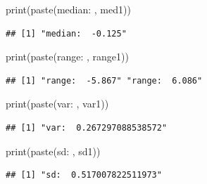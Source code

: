\documentclass[
]{article}
\newenvironment{Shaded}{\begin{snugshade}}{\end{snugshade}}
\newcommand{\FunctionTok}[1]{\textcolor[rgb]{0.00,0.00,0.00}{#1}}
\newcommand{\NormalTok}[1]{#1}
\newcommand{\StringTok}[1]{\textcolor[rgb]{0.31,0.60,0.02}{#1}}
\begin{document}
\begin{Shaded}
\begin{Highlighting}[]
\FunctionTok{print}\NormalTok{(}\FunctionTok{paste}\NormalTok{(}\StringTok{\textquotesingle{}median: \textquotesingle{}}\NormalTok{, med1))}
\end{Highlighting}
\end{Shaded}

\begin{verbatim}
## [1] "median:  -0.125"
\end{verbatim}

\begin{Shaded}
\begin{Highlighting}[]
\FunctionTok{print}\NormalTok{(}\FunctionTok{paste}\NormalTok{(}\StringTok{\textquotesingle{}range: \textquotesingle{}}\NormalTok{, range1))}
\end{Highlighting}
\end{Shaded}

\begin{verbatim}
## [1] "range:  -5.867" "range:  6.086"
\end{verbatim}

\begin{Shaded}
\begin{Highlighting}[]
\FunctionTok{print}\NormalTok{(}\FunctionTok{paste}\NormalTok{(}\StringTok{\textquotesingle{}var: \textquotesingle{}}\NormalTok{, var1))}
\end{Highlighting}
\end{Shaded}

\begin{verbatim}
## [1] "var:  0.267297088538572"
\end{verbatim}

\begin{Shaded}
\begin{Highlighting}[]
\FunctionTok{print}\NormalTok{(}\FunctionTok{paste}\NormalTok{(}\StringTok{\textquotesingle{}sd: \textquotesingle{}}\NormalTok{, sd1))}
\end{Highlighting}
\end{Shaded}

\begin{verbatim}
## [1] "sd:  0.517007822511973"
\end{verbatim}
\end{document}
